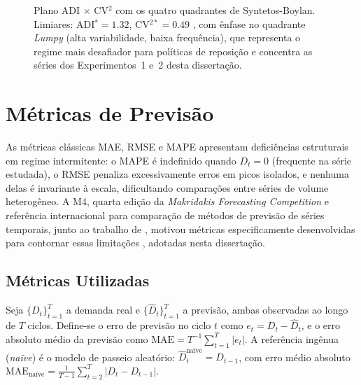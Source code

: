 \begin{figure}[htbp]
\centering
{}
\caption[Plano ADI $\times$ CV$^2$. Limiares: ADI$^* = 1.32$, CV$^{2*} = 0.49$.]{Plano ADI $\times$ CV$^2$ com os quatro quadrantes de Syntetos-Boylan. Limiares: ADI$^* = 1.32$, CV$^{2*} = 0.49$ \citep{Syntetos2005Categorization}, com ênfase no quadrante \textit{Lumpy} (alta variabilidade, baixa frequência), que representa o regime mais desafiador para políticas de reposição e concentra as séries dos Experimentos~1 e~2 desta dissertação.}
\label{fig:sb_quadrant}
\end{figure}

\section{Métricas de Previsão}

As métricas clássicas MAE, RMSE e MAPE apresentam deficiências estruturais em regime intermitente: o MAPE é indefinido quando $D_t = 0$ (frequente na série estudada), o RMSE penaliza excessivamente erros em picos isolados, e nenhuma delas é invariante à escala, dificultando comparações entre séries de volume heterogêneo. A M4, quarta edição da \textit{Makridakis Forecasting Competition} e referência internacional para comparação de métodos de previsão de séries temporais, junto ao trabalho de \citet{Hyndman2006MASE}, motivou métricas especificamente desenvolvidas para contornar essas limitações \citep{Makridakis2020M4Competition}, adotadas nesta dissertação.

\subsection{Métricas Utilizadas}

Seja $\{D_t\}_{t=1}^{T}$ a demanda real e $\{\hat{D}_t\}_{t=1}^{T}$ a previsão, ambas observadas ao longo de $T$ ciclos. Define-se o erro de previsão no ciclo $t$ como $e_t = D_t - \hat{D}_t$, e o erro absoluto médio da previsão como $\text{MAE} = T^{-1}\sum_{t=1}^{T}|e_t|$. A referência ingênua (\textit{naïve}) é o modelo de passeio aleatório: $\hat{D}_t^{\text{naïve}} = D_{t-1}$, com erro médio absoluto $\text{MAE}_{\text{naïve}} = \frac{1}{T-1}\sum_{t=2}^{T}|D_t - D_{t-1}|$.

